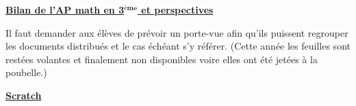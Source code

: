 \documentclass[12pt,a4paper]{article} %
\begin{document}
\begin{center}
\begin{LARGE}
\textbf{\underline{Bilan de l'AP math en 3$^\textbf{ème}$ et perspectives}}
\end{LARGE}
\end{center}\vspace{18pt}
Il faut demander aux élèves de prévoir un porte-vue afin qu'ils puissent regrouper les documents distribués et le cas échéant s'y référer.
(Cette année les feuilles sont restées volantes et finalement non disponibles voire elles ont été jetées à la poubelle.) \vspace{12pt} \\
\begin{Large}
\textbf{\underline{Scratch}}
\end{Large} \vspace{6pt}
\end{document}
